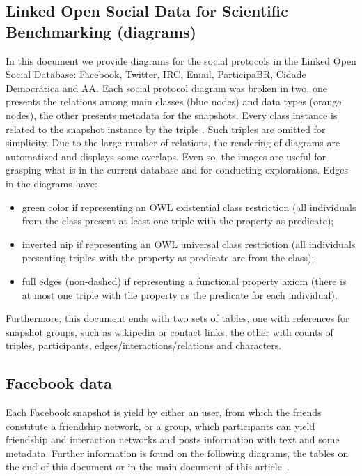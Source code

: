 
\begin{apendicesenv}
	\partapendices
	\chapter{Linked Open Social Data for Scientific Benchmarking (diagrams)}

	In this document we provide diagrams
	for the social protocols in the Linked Open Social Database:
	Facebook, Twitter, IRC, Email, ParticipaBR, Cidade Democrática and AA.
	Each social protocol diagram was broken in two, one presents the relations
	among main classes (blue nodes) and data types (orange nodes),
	the other presents metadata for the
	snapshots.
	Every class instance is related to the snapshot instance
	by the triple .
	Such triples are omitted for simplicity.
	Due to the large number of relations, the rendering of diagrams are
	automatized and displays some overlaps.
	Even so, the images are useful for grasping what is in the current
	database and for conducting explorations.
	Edges in the diagrams have:
	\begin{itemize}
		\item green color if representing an OWL existential
			class restriction (all individuals from the class present at least one triple with
				    the property as predicate);
			    \item inverted nip if representing an OWL universal class
				    restriction (all individuals presenting triples with the
								property as predicate are from the class);
							\item full edges (non-dashed) if representing a functional property
								axiom (there is at most one triple with the property as the
											    predicate for each individual).
	\end{itemize}

	Furthermore, this document ends with two sets of tables, one with
	references for snapshot groups, such as wikipedia or
	contact links, 
	the other with 
	counts of
	triples, participants, edges/interactions/relations and characters.


	\section{Facebook data}
	Each Facebook snapshot is yield by either an user, from which the
	friends constitute a friendship network, or a group, which participants
	can yield friendship and interaction networks and posts information with
	text and some metadata.
	Further information is found on the following diagrams, the tables on
	the end of this document or in the main document of this
	article~\cite{losd}.


\end{apendicesenv}
